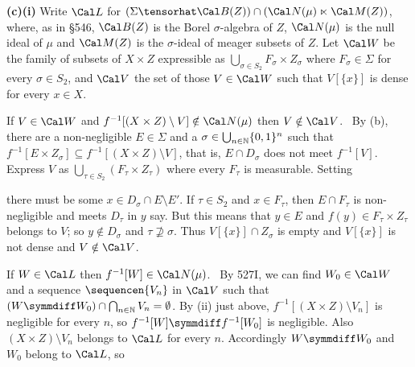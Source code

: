 {

\medskip

{\bf (c)(i)} Write $\Cal L$ for
$(\Sigma\tensorhat\Cal B(Z))\cap(\Cal N(\mu)\ltimes\Cal M(Z))$,
where, as in \S546, $\Cal B(Z)$ is the Borel $\sigma$-algebra of $Z$,
$\Cal N(\mu)$ is the null ideal of $\mu$ and $\Cal M(Z)$ is
the $\sigma$-ideal of meager subsets of $Z$.
Let $\Cal W$ be the family of subsets
of $X\times Z$ expressible as
$\bigcup_{\sigma\in S_2}F_{\sigma}\times Z_{\sigma}$
where $F_{\sigma}\in\Sigma$ for every $\sigma\in S_2$,
and $\Cal V$ the set of those
$V\in\Cal W$ such that $V[\{x\}]$ is dense for every $x\in X$.

\medskip

If $V\in\Cal W$ and $f^{-1}[(X\times Z)\setminus V]\notin\Cal N(\mu)$ then
$V\notin\Cal V$.
\Prf\ By (b), there are a non-negligible
$E\in\Sigma$ and a $\sigma\in\bigcup_{n\in\Bbb N}\{0,1\}^n$ such
that $f^{-1}[E\times Z_{\sigma}]\subseteq f^{-1}[(X\times Z)\setminus V]$, that
is, $E\cap D_{\sigma}$ does not meet $f^{-1}[V]$.
Express $V$ as $\bigcup_{\tau\in S_2}(F_{\tau}\times Z_{\tau})$ where every
$F_{\tau}$ is measurable.   Setting


\noindent there must be some $x\in D_{\sigma}\cap E\setminus E'$.   If
$\tau\in S_2$ and $x\in F_{\tau}$, then $E\cap F_{\tau}$ is
non-negligible and meets $D_{\tau}$ in $y$ say.   But this means that
$y\in E$ and $f(y)\in F_{\tau}\times Z_{\tau}$ belongs to $V$;
so $y\notin D_{\sigma}$ and $\tau\not\supseteq\sigma$.   Thus
$V[\{x\}]\cap Z_{\sigma}$ is empty and $V[\{x\}]$ is not dense and
$V\notin\Cal V$.\ \Qed

\medskip

 If $W\in\Cal L$ then $f^{-1}[W]\in\Cal N(\mu)$.
\Prf\ By 527I, we can find
$W_0\in\Cal W$ and a sequence $\sequencen{V_n}$ in $\Cal V$ such that
$(W\symmdiff W_0)\cap\bigcap_{n\in\Bbb N}V_n=\emptyset$.   
By (ii) just above,
$f^{-1}[(X\times Z)\setminus V_n]$ is negligible for every $n$, so
$f^{-1}[W]\symmdiff f^{-1}[W_0]$ is negligible.   
Also $(X\times Z)\setminus V_n$
belongs to $\Cal L$ for every $n$.   Accordingly $W\symmdiff W_0$ and
$W_0$ belong to $\Cal L$, so

}
